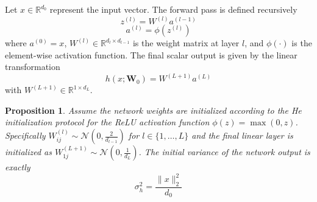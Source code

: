 \documentclass[letter,11pt]{article}
\newtheorem{proposition}{Proposition}
\begin{document}
Let $x \in \mathbb{R}^{d_0}$ represent the input vector. The forward pass is defined recursively
\begin{equation}
z^{(l)} = W^{(l)} a^{(l-1)}
\end{equation}
\begin{equation}
a^{(l)} = \phi(z^{(l)})
\end{equation}
where $a^{(0)} = x$, $W^{(l)} \in \mathbb{R}^{d_l \times d_{l-1}}$ is the weight matrix at layer $l$, and $\phi(\cdot)$ is the element-wise activation function. The final scalar output is given by the linear transformation
\begin{equation}
h(x; \mathbf{W}_0) = W^{(L+1)} a^{(L)}
\end{equation}
with $W^{(L+1)} \in \mathbb{R}^{1 \times d_L}$.

\begin{proposition}
Assume the network weights are initialized according to the He initialization protocol for the ReLU activation function $\phi(z) = \max(0, z)$. Specifically $W_{ij}^{(l)} \sim \mathcal{N}\left(0, \frac{2}{d_{l-1}}\right)$ for $l \in \{1, \dots, L\}$ and the final linear layer is initialized as $W_{1j}^{(L+1)} \sim \mathcal{N}\left(0, \frac{1}{d_L}\right)$. The initial variance of the network output is exactly
\begin{equation}
\sigma_h^2 = \frac{\|x\|_2^2}{d_0}
\end{equation}
\end{proposition}
\end{document}
